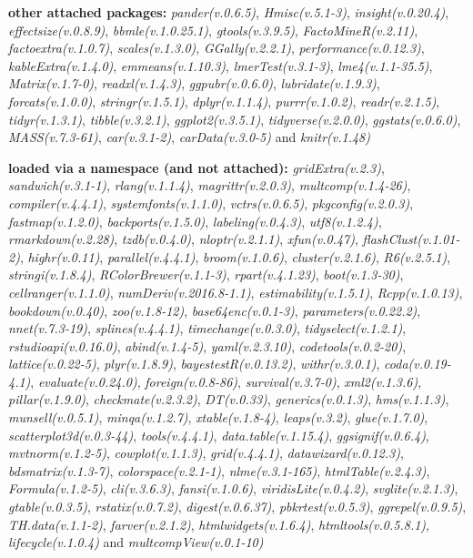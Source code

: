\documentclass[
  bookmarksnumbered]{article}
\begin{document}
\textbf{other attached packages:}
\emph{pander(v.0.6.5)}, \emph{Hmisc(v.5.1-3)}, \emph{insight(v.0.20.4)}, \emph{effectsize(v.0.8.9)}, \emph{bbmle(v.1.0.25.1)}, \emph{gtools(v.3.9.5)}, \emph{FactoMineR(v.2.11)}, \emph{factoextra(v.1.0.7)}, \emph{scales(v.1.3.0)}, \emph{GGally(v.2.2.1)}, \emph{performance(v.0.12.3)}, \emph{kableExtra(v.1.4.0)}, \emph{emmeans(v.1.10.3)}, \emph{lmerTest(v.3.1-3)}, \emph{lme4(v.1.1-35.5)}, \emph{Matrix(v.1.7-0)}, \emph{readxl(v.1.4.3)}, \emph{ggpubr(v.0.6.0)}, \emph{lubridate(v.1.9.3)}, \emph{forcats(v.1.0.0)}, \emph{stringr(v.1.5.1)}, \emph{dplyr(v.1.1.4)}, \emph{purrr(v.1.0.2)}, \emph{readr(v.2.1.5)}, \emph{tidyr(v.1.3.1)}, \emph{tibble(v.3.2.1)}, \emph{ggplot2(v.3.5.1)}, \emph{tidyverse(v.2.0.0)}, \emph{ggstats(v.0.6.0)}, \emph{MASS(v.7.3-61)}, \emph{car(v.3.1-2)}, \emph{carData(v.3.0-5)} and \emph{knitr(v.1.48)}

\textbf{loaded via a namespace (and not attached):}
\emph{gridExtra(v.2.3)}, \emph{sandwich(v.3.1-1)}, \emph{rlang(v.1.1.4)}, \emph{magrittr(v.2.0.3)}, \emph{multcomp(v.1.4-26)}, \emph{compiler(v.4.4.1)}, \emph{systemfonts(v.1.1.0)}, \emph{vctrs(v.0.6.5)}, \emph{pkgconfig(v.2.0.3)}, \emph{fastmap(v.1.2.0)}, \emph{backports(v.1.5.0)}, \emph{labeling(v.0.4.3)}, \emph{utf8(v.1.2.4)}, \emph{rmarkdown(v.2.28)}, \emph{tzdb(v.0.4.0)}, \emph{nloptr(v.2.1.1)}, \emph{xfun(v.0.47)}, \emph{flashClust(v.1.01-2)}, \emph{highr(v.0.11)}, \emph{parallel(v.4.4.1)}, \emph{broom(v.1.0.6)}, \emph{cluster(v.2.1.6)}, \emph{R6(v.2.5.1)}, \emph{stringi(v.1.8.4)}, \emph{RColorBrewer(v.1.1-3)}, \emph{rpart(v.4.1.23)}, \emph{boot(v.1.3-30)}, \emph{cellranger(v.1.1.0)}, \emph{numDeriv(v.2016.8-1.1)}, \emph{estimability(v.1.5.1)}, \emph{Rcpp(v.1.0.13)}, \emph{bookdown(v.0.40)}, \emph{zoo(v.1.8-12)}, \emph{base64enc(v.0.1-3)}, \emph{parameters(v.0.22.2)}, \emph{nnet(v.7.3-19)}, \emph{splines(v.4.4.1)}, \emph{timechange(v.0.3.0)}, \emph{tidyselect(v.1.2.1)}, \emph{rstudioapi(v.0.16.0)}, \emph{abind(v.1.4-5)}, \emph{yaml(v.2.3.10)}, \emph{codetools(v.0.2-20)}, \emph{lattice(v.0.22-5)}, \emph{plyr(v.1.8.9)}, \emph{bayestestR(v.0.13.2)}, \emph{withr(v.3.0.1)}, \emph{coda(v.0.19-4.1)}, \emph{evaluate(v.0.24.0)}, \emph{foreign(v.0.8-86)}, \emph{survival(v.3.7-0)}, \emph{xml2(v.1.3.6)}, \emph{pillar(v.1.9.0)}, \emph{checkmate(v.2.3.2)}, \emph{DT(v.0.33)}, \emph{generics(v.0.1.3)}, \emph{hms(v.1.1.3)}, \emph{munsell(v.0.5.1)}, \emph{minqa(v.1.2.7)}, \emph{xtable(v.1.8-4)}, \emph{leaps(v.3.2)}, \emph{glue(v.1.7.0)}, \emph{scatterplot3d(v.0.3-44)}, \emph{tools(v.4.4.1)}, \emph{data.table(v.1.15.4)}, \emph{ggsignif(v.0.6.4)}, \emph{mvtnorm(v.1.2-5)}, \emph{cowplot(v.1.1.3)}, \emph{grid(v.4.4.1)}, \emph{datawizard(v.0.12.3)}, \emph{bdsmatrix(v.1.3-7)}, \emph{colorspace(v.2.1-1)}, \emph{nlme(v.3.1-165)}, \emph{htmlTable(v.2.4.3)}, \emph{Formula(v.1.2-5)}, \emph{cli(v.3.6.3)}, \emph{fansi(v.1.0.6)}, \emph{viridisLite(v.0.4.2)}, \emph{svglite(v.2.1.3)}, \emph{gtable(v.0.3.5)}, \emph{rstatix(v.0.7.2)}, \emph{digest(v.0.6.37)}, \emph{pbkrtest(v.0.5.3)}, \emph{ggrepel(v.0.9.5)}, \emph{TH.data(v.1.1-2)}, \emph{farver(v.2.1.2)}, \emph{htmlwidgets(v.1.6.4)}, \emph{htmltools(v.0.5.8.1)}, \emph{lifecycle(v.1.0.4)} and \emph{multcompView(v.0.1-10)}
\end{document}
